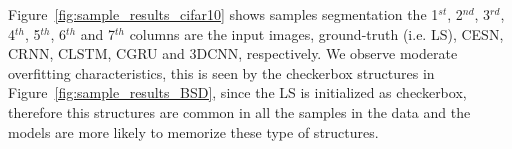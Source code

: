 \documentclass{WitsPhysicsReport}
\begin{document}
 
\begin{table}[H]
\centering
\caption{CIFAR-10 testing results. Here we compare various models and noise is also included.}
    \label{tab:cifar_10}
\end{table}

Figure~\ref{fig:sample_results_cifar10} shows samples segmentation the 1$^{st}$, 2$^{nd}$, 3$^{rd}$, 4$^{th}$, 5$^{th}$, 6$^{th}$ and 7$^{th}$ columns are the input images, ground-truth (i.e. LS), CESN, CRNN, CLSTM, CGRU and 3DCNN, respectively. We observe moderate overfitting characteristics, this is seen by the checkerbox structures in Figure~\ref{fig:sample_results_BSD}, since the LS is initialized as checkerbox, therefore this structures are common in all the samples in the data and the models are more likely to memorize these type of structures. 
\end{document}
